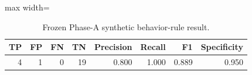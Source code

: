 \begin{table}[htbp]
\centering
\caption{Frozen Phase-A synthetic behavior-rule result.}
\label{tab:phase-a}
\small
\begin{adjustbox}{max width=\columnwidth}
\begin{tabular}{rrrrrrrr}
\toprule
TP & FP & FN & TN & Precision & Recall & F1 & Specificity \\
\midrule
4 & 1 & 0 & 19 & 0.800 & 1.000 & 0.889 & 0.950 \\
\bottomrule
\end{tabular}
\end{adjustbox}
\par{}
\end{table}
